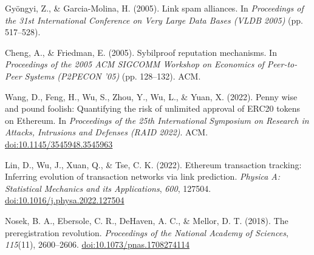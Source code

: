 \begin{enumerate}[label={[\arabic*]}, leftmargin=*, itemsep=0.35em, parsep=0pt]
  \item{}\label{ref:71} Gy\"{o}ngyi, Z., \& Garcia-Molina, H. (2005). Link spam alliances. In \textit{Proceedings of the 31st International Conference on Very Large Data Bases (VLDB 2005)} (pp. 517--528).
  \item{}\label{ref:72} Cheng, A., \& Friedman, E. (2005). Sybilproof reputation mechanisms. In \textit{Proceedings of the 2005 ACM SIGCOMM Workshop on Economics of Peer-to-Peer Systems (P2PECON '05)} (pp. 128--132). ACM.
  \item{}\label{ref:73} Wang, D., Feng, H., Wu, S., Zhou, Y., Wu, L., \& Yuan, X. (2022). Penny wise and pound foolish: Quantifying the risk of unlimited approval of ERC20 tokens on Ethereum. In \textit{Proceedings of the 25th International Symposium on Research in Attacks, Intrusions and Defenses (RAID 2022)}. ACM. \href{https://doi.org/10.1145/3545948.3545963}{doi:10.1145/3545948.3545963}
  \item{}\label{ref:74} Lin, D., Wu, J., Xuan, Q., \& Tse, C. K. (2022). Ethereum transaction tracking: Inferring evolution of transaction networks via link prediction. \textit{Physica A: Statistical Mechanics and its Applications}, \textit{600}, 127504. \href{https://doi.org/10.1016/j.physa.2022.127504}{doi:10.1016/j.physa.2022.127504}
  \item{}\label{ref:75} Nosek, B. A., Ebersole, C. R., DeHaven, A. C., \& Mellor, D. T. (2018). The preregistration revolution. \textit{Proceedings of the National Academy of Sciences}, \textit{115}(11), 2600--2606. \href{https://doi.org/10.1073/pnas.1708274114}{doi:10.1073/pnas.1708274114}
\end{enumerate}

